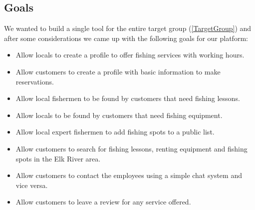 \subsection{Goals}
We wanted to build a single tool for the entire target group (\autoref{TargetGroup}) and after some considerations we came up with the following goals for our platform:
\begin{itemize}
\item Allow locals to create a profile to offer fishing services with working hours.
\item Allow customers to create a profile with basic information to make reservations.
\item Allow local fishermen to be found by customers that need fishing lessons.
\item Allow locals to be found by customers that need fishing equipment.
\item Allow local expert fishermen to add fishing spots to a public list.
\item Allow customers to search for fishing lessons, renting equipment and fishing spots in the Elk River area.
\item Allow customers to contact the employees using a simple chat system and vice versa.
\item Allow customers to leave a review for any service offered.
\end{itemize}
